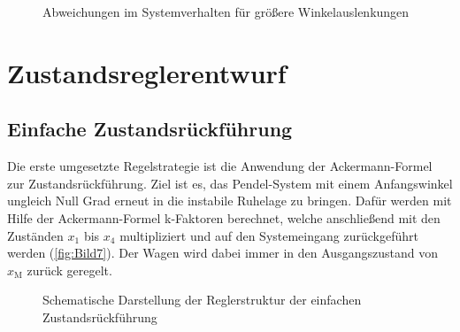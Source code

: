 \documentclass[
	pagesize,
	fontsize=12pt,
	paper=a4,
	oneside,
   reqno
]{scrartcl}
\begin{document}
\begin{figure}[H]
    \centering
    \caption[Vergleich der beiden Winkelverläufe in Grad mit Abweichung]{Abweichungen im Systemverhalten für größere Winkelauslenkungen}
    \label{fig:Bild6}
\end{figure}

\clearpage

\section{Zustandsreglerentwurf} \label{sec:Zustandsreglerentwurf}

\subsection{Einfache Zustandsrückführung} \label{sec:Ackermann-Formel}
Die erste umgesetzte Regelstrategie ist die Anwendung der Ackermann-Formel zur Zustandsrückführung. Ziel ist es, das Pendel-System mit einem Anfangswinkel ungleich Null Grad erneut in die instabile Ruhelage zu bringen. Dafür werden mit Hilfe der Ackermann-Formel k-Faktoren berechnet, welche anschließend mit den Zuständen $x_{\mathrm{1}}$ bis $x_{\mathrm{4}}$ multipliziert und auf den Systemeingang zurückgeführt werden (\autoref{fig:Bild7}). Der Wagen wird dabei immer in den Ausgangszustand von $x_{\mathrm{M}}$ zurück geregelt.

\begin{figure}[H]
    \centering
    \caption[Reglerstruktur Ackermann]{Schematische Darstellung der Reglerstruktur der einfachen Zustandsrückführung}
    \label{fig:Bild7}
\end{figure}
\end{document}
